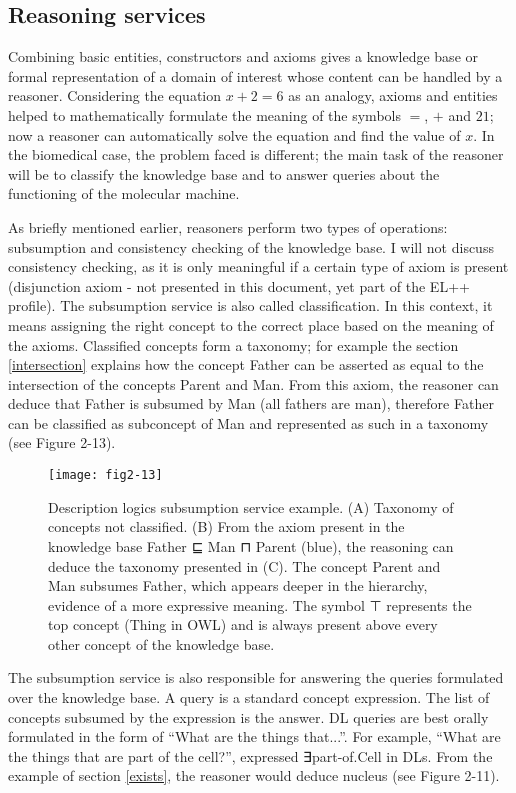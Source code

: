 \subsection{Reasoning services}

Combining basic entities, constructors and axioms gives a knowledge base or formal representation of a domain of interest whose content can be handled by a reasoner. Considering the equation $ x + 2 = 6 $ as an analogy, axioms and entities helped to mathematically formulate the meaning of the symbols $ = $, $ + $ and $ 21 $; now a reasoner can automatically solve the equation and find the value of $ x $. In the biomedical case, the problem faced is different; the main task of the reasoner will be to classify the knowledge base and to answer queries about the functioning of the molecular machine.

As briefly mentioned earlier, reasoners perform two types of operations: subsumption and consistency checking of the knowledge base. I will not discuss consistency checking, as it is only meaningful if a certain type of axiom is present (disjunction axiom - not presented in this document, yet part of the EL++ profile). The subsumption service is also called classification. In this context, it means assigning the right concept to the correct place based on the meaning of the axioms. Classified concepts form a taxonomy; for example the section \ref{intersection} explains how the concept Father can be asserted as equal to the intersection of the concepts Parent and Man. From this axiom, the reasoner can deduce that Father is subsumed by Man (all fathers are man), therefore Father can be classified as subconcept of Man and represented as such in a taxonomy (see Figure 2-13).

\begin{figure}[ht]
    \centering
    \texttt{[image: fig2-13]}
    \caption{Description logics subsumption service example. (A) Taxonomy of concepts not classified. (B) From the axiom present in the knowledge base Father ⊑ Man ⊓ Parent (blue), the reasoning can deduce the taxonomy presented in (C). The concept Parent and Man subsumes Father, which appears deeper in the hierarchy, evidence of a more expressive meaning. The symbol ⊤ represents the top concept (Thing in OWL) and is always present above every other concept of the knowledge base.}
    \label{fig2-13}
\end{figure}

The subsumption service is also responsible for answering the queries formulated over the knowledge base. A query is a standard concept expression. The list of concepts subsumed by the expression is the answer. DL queries are best orally formulated in the form of “What are the things that...”. For example, “What are the things that are part of the cell?”, expressed ∃part-of.Cell in DLs. From the example of section \ref{exists}, the reasoner would deduce nucleus (see Figure 2-11).

